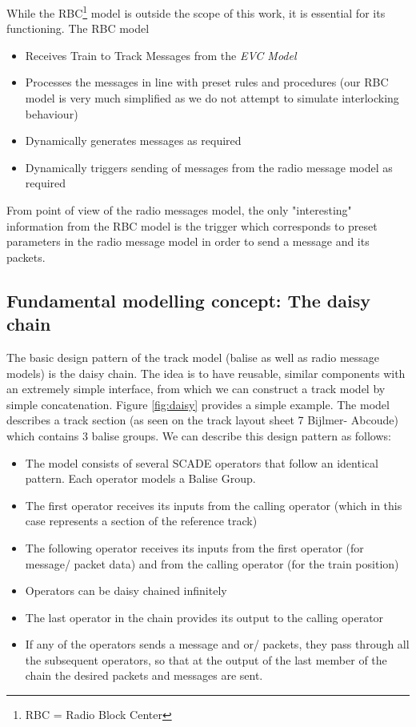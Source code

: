 \documentclass{template/openetcs_article}
\begin{document}
While the RBC\footnote{RBC = Radio Block Center} model is outside the scope of this work, it is essential for its functioning. The RBC model
\begin{itemize}
 \item Receives Train to Track Messages from the \emph{EVC Model}
 \item Processes the messages in line with preset rules and procedures (our RBC model is very much simplified as we do not attempt to simulate interlocking behaviour)
 \item Dynamically generates messages as required
 \item Dynamically triggers sending of messages from the radio message model as required
\end{itemize}

From point of view of the radio messages model, the only "interesting" information from the RBC model is the trigger which corresponds to preset parameters in the radio message model in order to send a message and its packets.

\subsection{Fundamental modelling concept: The daisy chain}

The basic design pattern of the track model (balise as well as radio message models) is the daisy chain. The idea is to have reusable, similar components with an extremely simple interface, from which we can construct a track model by simple concatenation. Figure \ref{fig:daisy} provides a simple example. The model describes a track section (as seen on the track layout sheet  7 Bijlmer- Abcoude) which contains 3 balise groups.\newline
We can describe this design pattern as follows:
\begin{itemize}
 \item The model consists of several SCADE operators that follow an identical pattern. Each operator models a Balise Group.
 \item The first operator receives its inputs from the calling operator (which in this case represents a section of the reference track)
 \item The following operator receives its inputs from the first operator (for message/ packet data) and from the calling operator (for the train position)
 \item Operators can be daisy chained infinitely
 \item The last operator in the chain provides its output to the calling operator
 \item If any of the operators sends a message and or/ packets, they pass through all the subsequent operators, so that at the output of the last member of the chain the desired packets and messages are sent.
\end{itemize}
\end{document}
